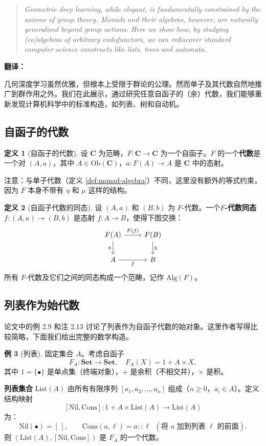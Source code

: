 \documentclass[12pt,a4paper]{ctexart}
\theoremstyle{definition}
\newtheorem{definition}{定义}[section]
\newtheorem{example}[definition]{例}
\newcommand{\cat}[1]{\mathbf{#1}}
\newcommand{\Set}{\cat{Set}}
\newcommand{\Alg}{\mathrm{Alg}}
\newcommand{\List}{\mathrm{List}}
\newcommand{\ob}[1]{\mathrm{Ob}(#1)}
\begin{document}
\begin{quote}
\itshape
Geometric deep learning, while elegant, is fundamentally constrained by the axioms of group theory. Monads and their algebras, however, are naturally generalised beyond group actions. Here we show how, by studying (co)algebras of arbitrary endofunctors, we can rediscover standard computer science constructs like lists, trees and automata.
\end{quote}

\textbf{翻译：}

几何深度学习虽然优雅，但根本上受限于群论的公理。然而单子及其代数自然地推广到群作用之外。我们在此展示，通过研究任意自函子的（余）代数，我们能够重新发现计算机科学中的标准构造，如列表、树和自动机。

\subsection{自函子的代数}

\begin{definition}[自函子的代数]\label{def:endo-alg}
设 $\cat C$ 为范畴，$F:\cat C\to\cat C$ 为一个自函子。$F$ 的一个\textbf{代数}是一个对 $(A,a)$，其中 $A\in\ob{\cat C}$，$a:F(A)\to A$ 是 $\cat C$ 中的态射。
\end{definition}

注意：与单子代数（定义 \ref{def:monad-algebra}）不同，这里没有额外的等式约束，因为 $F$ 本身不带有 $\eta$ 和 $\mu$ 这样的结构。

\begin{definition}[自函子代数的同态]\label{def:endo-alg-hom}
设 $(A,a)$ 和 $(B,b)$ 为 $F$-代数。一个\textbf{$F$-代数同态} $f:(A,a)\to(B,b)$ 是态射 $f:A\to B$，使得下图交换：
\[
\begin{tikzcd}
F(A) \arrow[r,"F(f)"] \arrow[d,"a"'] & F(B) \arrow[d,"b"] \\
A \arrow[r,"f"'] & B
\end{tikzcd}
\]
所有 $F$-代数及它们之间的同态构成一个范畴，记作 $\Alg(F)$。
\end{definition}

\subsection{列表作为始代数}

论文中的例 2.9 和注 2.13 讨论了列表作为自函子代数的始对象。这里作者写得比较简略，下面我们给出完整的数学构造。

\begin{example}[列表]\label{ex:list}
固定集合 $A$。考虑自函子
\[F_A:\Set\longrightarrow\Set,\quad F_A(X)=1+A\times X,\]
其中 $1=\{\bullet\}$ 是单点集（终端对象），$+$ 是余积（不相交并），$\times$ 是积。

\textbf{列表集合} $\List(A)$ 由所有有限序列 $[a_1,a_2,\dots,a_n]$ 组成（$n\ge 0$，$a_i\in A$）。定义结构映射
\[[\mathrm{Nil},\mathrm{Cons}]:1+A\times\List(A)\longrightarrow\List(A)\]
为：
\[\mathrm{Nil}(\bullet)=[\,],\qquad \mathrm{Cons}(a,\ell)=a::\ell\;\;(\text{将 }a\text{ 加到列表 }\ell\text{ 的前面}).\]
则 $(\List(A),[\mathrm{Nil},\mathrm{Cons}])$ 是 $F_A$ 的一个代数。
\end{example}
\end{document}

